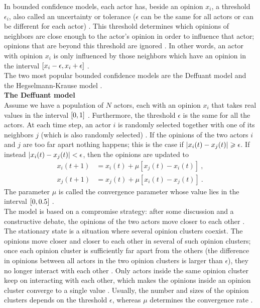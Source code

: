 \documentclass[11 pt , letterpaper , twoside , openright]{book}
\begin{document}
In bounded confidence models, each actor has, beside an opinion $x_i$, a threshold $\epsilon_i$, also called an uncertainty or tolerance ($\epsilon$ can be the same for all actors or can be different for each actor) \cite{Castellano2009}\cite{Deffuant2006}. This threshold determines which opinions of neighbors are close enough to the actor's opinion in order to influence that actor; opinions that are beyond this threshold are ignored \cite{Deffuant2006}. In other words, an actor with opinion $x_i$ is only influenced by those neighbors which have an opinion in the interval $\interval{x_i-\epsilon}{x_i+\epsilon}$ \cite{Castellano2009}. \\
\newline
The two most popular bounded confidence models are the Deffuant model and the Hegselmann-Krause model \cite{Castellano2009}. \\
\newline
\textbf{The Deffuant model}\\
\newline
Assume we have a population of $N$ actors, each with an opinion $x_i$ that takes real values in the interval $\interval{0}{1}$ \cite{Castellano2009}. Furthermore, the threshold $\epsilon$ is the same for all the actors. At each time step, an actor $i$ is randomly selected together with one of its neighbors $j$ (which is also randomly selected) \cite{Castellano2009}. If the opinions of the two actors $i$ and $j$ are too far apart nothing happens; this is the case if $\abs{x_i(t) - x_j(t)} \geqslant \epsilon$. If instead $\abs{x_i(t) - x_j(t)} < \epsilon$, then the opinions are updated to \cite{Castellano2009}\cite{Deffuant2000}
\begin{equation}
\begin{split}
	x_i(t+1) &= x_i(t) + \mu [x_j(t) - x_i(t)] \ ,\\
	x_j(t+1) &= x_j(t) + \mu [x_i(t) - x_j(t)] \ .
\end{split}
\end{equation}
The parameter $\mu$ is called the convergence parameter whose value lies in the interval $\interval{0}{0.5}$ \cite{Castellano2009}. \\
\newline
The model is based on a compromise strategy: after some discussion and a constructive debate, the opinions of the two actors move closer to each other \cite{Castellano2009}. The stationary state is a situation where several opinion clusters coexist. The opinions move closer and closer to each other in several of such opinion clusters; once each opinion cluster is sufficiently far apart from the others (the difference in opinions between all actors in the two opinion clusters is larger than $\epsilon$), they no longer interact with each other \cite{Castellano2009}. Only actors inside the same opinion cluster keep on interacting with each other, which makes the opinions inside an opinion cluster converge to a single value \cite{Castellano2009}. Usually, the number and sizes of the opinion clusters depends on the threshold $\epsilon$, whereas $\mu$ determines the convergence rate \cite{Castellano2009}.\\
\end{document}
